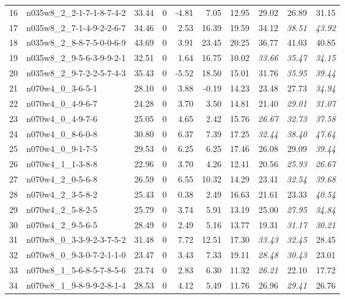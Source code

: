 \documentclass[cic,tc, twoside]{iiufrgs}
\begin{document}
\begin{table}[!]
{\begin{tabular}{rlrrrrrrrr}
   16 & n035w8\_2\_2-1-7-1-8-7-4-2 & 33.44 &   0 & -4.81 & 7.05 & 12.95 & 29.02 & 26.89 & 31.15 \\
   17 & n035w8\_2\_7-1-4-9-2-2-6-7 & 34.46 &   0 & 2.53 & 16.39 & 19.59 & 34.12 & \it 38.51 & \it 43.92 \\
   18 & n035w8\_2\_8-8-7-5-0-0-6-9 & 43.69 &   0 & 3.91 & 23.45 & 20.25 & 36.77 & 41.03 & 40.85 \\
   19 & n035w8\_2\_9-5-6-3-9-9-2-1 & 32.51 &   0 & 1.64 & 16.75 & 10.02 & \it 33.66 & \it 35.47 & \it 34.15 \\
   20 & n035w8\_2\_9-7-2-2-5-7-4-3 & 35.43 &   0 & -5.52 & 18.50 & 15.01 & 31.76 & \it 35.95 & \it 39.44 \\
   21 & n070w4\_0\_3-6-5-1 & 28.10 &   0 & 3.88 & -0.19 & 14.23 & 23.48 & 27.73 & \it 34.94 \\
   22 & n070w4\_0\_4-9-6-7 & 24.28 &   0 & 3.70 & 3.50 & 14.81 & 21.40 & \it 29.01 & \it 31.07 \\
   23 & n070w4\_0\_4-9-7-6 & 25.05 &   0 & 4.65 & 2.42 & 15.76 & \it 26.67 & \it 32.73 & \it 37.58 \\
   24 & n070w4\_0\_8-6-0-8 & 30.80 &   0 & 6.37 & 7.39 & 17.25 & \it 32.44 & \it 38.40 & \it 47.64 \\
   25 & n070w4\_0\_9-1-7-5 & 29.53 &   0 & 6.25 & 6.25 & 17.46 & 26.08 & 29.09 & \it 39.44 \\
   26 & n070w4\_1\_1-3-8-8 & 22.96 &   0 & 3.70 & 4.26 & 12.41 & 20.56 & \it 25.93 & \it 26.67 \\
   27 & n070w4\_2\_0-5-6-8 & 26.59 &   0 & 6.55 & 10.32 & 14.29 & 23.41 & \it 32.54 & \it 39.68 \\
   28 & n070w4\_2\_3-5-8-2 & 25.43 &   0 & 0.38 & 2.49 & 16.63 & 21.61 & 23.33 & \it 40.54 \\
   29 & n070w4\_2\_5-8-2-5 & 25.79 &   0 & 3.74 & 5.91 & 13.19 & 25.00 & \it 27.95 & \it 34.84 \\
   30 & n070w4\_2\_9-5-6-5 & 28.49 &   0 & 2.49 & 5.16 & 13.77 & 19.31 & \it 31.17 & \it 30.21 \\
   31 & n070w8\_0\_3-3-9-2-3-7-5-2 & 31.48 &   0 & 7.72 & 12.51 & 17.30 & \it 33.43 & \it 32.45 & 28.45 \\
   32 & n070w8\_0\_9-3-0-7-2-1-1-0 & 23.47 &   0 & 3.43 & 7.33 & 19.11 & \it 28.48 & \it 30.43 & 23.01 \\
   33 & n070w8\_1\_5-6-8-5-7-8-5-6 & 23.74 &   0 & 2.83 & 6.30 & 11.32 & \it 26.21 & 22.10 & 17.72 \\
   34 & n070w8\_1\_9-8-9-9-2-8-1-4 & 28.53 &   0 & 4.12 & 5.49 & 11.76 & 26.96 & \it 29.41 & 26.76 \\

\end{tabular}}
\end{table}
\end{document}
